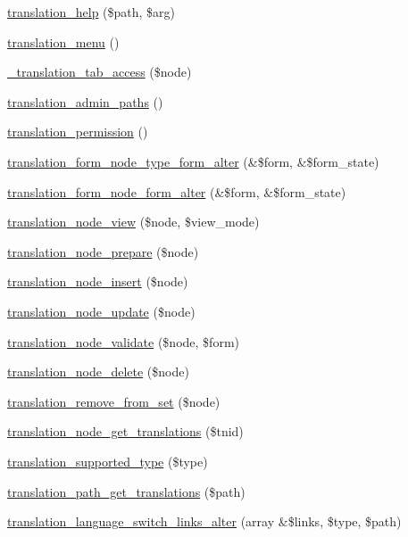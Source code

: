 \begin{DoxyCompactItemize}
\item 
\hyperlink{translation_8module_a37e15a4a5e6c4c30c73d066e80134e08}{translation\_\-help} (\$path, \$arg)
\item 
\hyperlink{translation_8module_a31c2f0307fce1bcb4da69eda5131f4c5}{translation\_\-menu} ()
\item 
\hyperlink{translation_8module_a3c6c1a4fc789dc7d690e0d5c2ce96e36}{\_\-translation\_\-tab\_\-access} (\$node)
\item 
\hyperlink{translation_8module_ad12e430e331144bbab6b70034e2f1de8}{translation\_\-admin\_\-paths} ()
\item 
\hyperlink{translation_8module_a45f21da871a0b08fecaa736de409db16}{translation\_\-permission} ()
\item 
\hyperlink{translation_8module_a80c98d8d21852c466102ce1516de426c}{translation\_\-form\_\-node\_\-type\_\-form\_\-alter} (\&\$form, \&\$form\_\-state)
\item 
\hyperlink{translation_8module_a0af45118bec0e066f3f2fb6d93e5ecfb}{translation\_\-form\_\-node\_\-form\_\-alter} (\&\$form, \&\$form\_\-state)
\item 
\hyperlink{translation_8module_ad5700a0fbf2cbcc954aa8a6a01ffb4d3}{translation\_\-node\_\-view} (\$node, \$view\_\-mode)
\item 
\hyperlink{translation_8module_abc386666ed82cbde915c1e990c4184c4}{translation\_\-node\_\-prepare} (\$node)
\item 
\hyperlink{translation_8module_a990ccc695dc79527fcb3b5359e85d591}{translation\_\-node\_\-insert} (\$node)
\item 
\hyperlink{translation_8module_a37a29aeaa942629df85189e8ce71c6ec}{translation\_\-node\_\-update} (\$node)
\item 
\hyperlink{translation_8module_a91f395bd462e1dcf90a1def42948f5f4}{translation\_\-node\_\-validate} (\$node, \$form)
\item 
\hyperlink{translation_8module_a37691855a67b4d13490077dd814a7a56}{translation\_\-node\_\-delete} (\$node)
\item 
\hyperlink{translation_8module_ab01d39380356f99eee6f5ad5a30a07a4}{translation\_\-remove\_\-from\_\-set} (\$node)
\item 
\hyperlink{translation_8module_a9cd21a77e9349062baa9a7c861797204}{translation\_\-node\_\-get\_\-translations} (\$tnid)
\item 
\hyperlink{translation_8module_ad7a4f3a66afd7b392ae2c1ebd5854d7f}{translation\_\-supported\_\-type} (\$type)
\item 
\hyperlink{translation_8module_a383176f0527c7acf255135ff564bf642}{translation\_\-path\_\-get\_\-translations} (\$path)
\item 
\hyperlink{translation_8module_a8f1070c7d30772f67e0200555e94c53a}{translation\_\-language\_\-switch\_\-links\_\-alter} (array \&\$links, \$type, \$path)
\end{DoxyCompactItemize}


